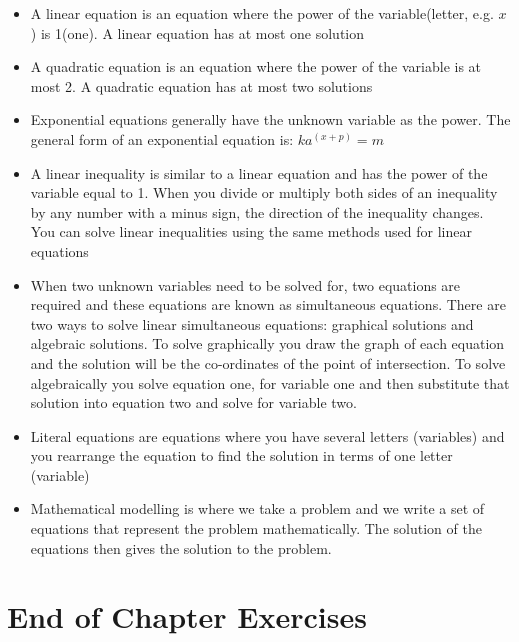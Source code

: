\label{m39263*eip-909}\begin{itemize}[noitemsep]
            \item A linear equation is an
equation where the power of the variable(letter, e.g. \begin{math}x\end{math}) is 1(one). A linear equation has at most one solution\item A quadratic equation is an equation where the power of the variable is at most 2. A quadratic equation has at most two solutions\item Exponential equations generally have the unknown variable as the power. The general form of an exponential equation is: 
	\begin{math}k{a}^{\left(x+p\right)}=m\end{math}\item A linear inequality is similar to a linear equation and has the power of the variable equal to 1.
	When you divide or multiply both sides of an inequality by any number with a minus sign, the direction of the inequality changes. You can solve linear inequalities using the same methods used for linear equations\item When two unknown variables need to be solved for, two equations are required and these equations are known as simultaneous equations. There are two ways to solve linear simultaneous equations: graphical solutions and algebraic solutions. To solve graphically you draw the graph of each equation and the solution will be the co-ordinates of the point of intersection. To solve algebraically you solve equation one, for variable one and then substitute that solution into equation two and solve for variable two.\item Literal equations are equations where you have several letters (variables) and you rearrange the equation to find the solution in terms of one letter (variable)\item Mathematical modelling is where we take a problem and we write a set of equations that represent the problem mathematically. The solution of the equations then gives the solution to the problem.\end{itemize}
        \label{m39263*uid119}



            \section{ End of Chapter Exercises}
            \nopagebreak
            
